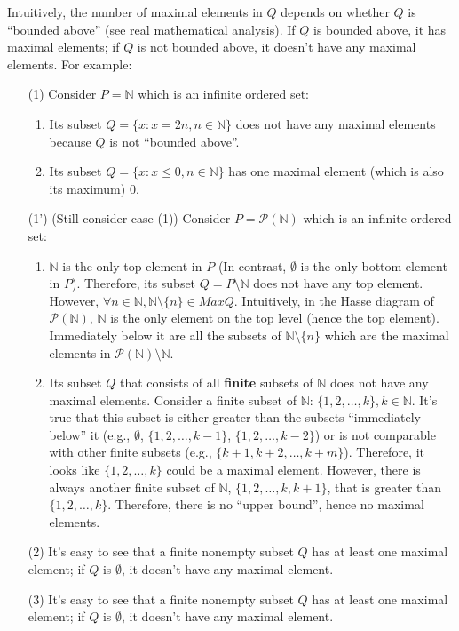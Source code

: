 \documentclass[12pt, letterpaper, oneside]{book}
\begin{document}
Intuitively, the number of maximal elements in $Q$ depends on whether $Q$ is ``bounded above'' (see real mathematical
analysis). If $Q$ is bounded above, it has maximal elements; if $Q$ is not bounded above, it doesn't have any maximal
elements. For example:
\begin{enumerate}
  \item[(1)] Consider $P = \mathbb{N}$ which is an infinite ordered set:
        \begin{enumerate}
          \item Its subset $Q = \{x: x = 2n, n \in \mathbb{N}\}$ does not have any maximal elements because $Q$ is not
                ``bounded above''.
          \item Its subset $Q = \{x: x \leqslant 0, n \in \mathbb{N}\}$ has one maximal element (which is also its
                maximum) 0.
        \end{enumerate}
  \item [(1')] (Still consider case (1)) Consider $P = \mathcal{P}(\mathbb{N})$ which is an infinite ordered set:
        \begin{enumerate}
          \item $\mathbb{N}$ is the only top element in $P$ (In contrast, $\emptyset$ is the only bottom element in
                $P$). Therefore, its subset $Q = P \setminus \mathbb{N}$ does not have any top element. However,
                $\forall n \in \mathbb{N}, \mathbb{N} \setminus \{n\} \in MaxQ$. Intuitively, in the Hasse diagram of
                $\mathcal{P}(\mathbb{N})$, $\mathbb{N}$ is the only element on the top level (hence the top element).
                Immediately below it are all the subsets of $\mathbb{N} \setminus \{n\}$ which are the maximal elements
                in $\mathcal{P}(\mathbb{N}) \setminus \mathbb{N}$.
          \item Its subset $Q$ that consists of all \textbf{finite} subsets of $\mathbb{N}$ does not have any maximal
                elements. Consider a finite subset of $\mathbb{N}$: $\{1, 2, \ldots, k\}, k \in \mathbb{N}$. It's true
                that this subset is either greater than the subsets ``immediately below'' it (e.g., $\emptyset$,
                $\{1, 2, \ldots, k-1\}$, $\{1, 2, \ldots, k-2\}$) or is not comparable with other finite subsets (e.g.,
                $\{k+1, k+2, \ldots, k+m\}$). Therefore, it looks like $\{1, 2, \ldots, k\}$ could be a maximal element.
                However, there is always another finite subset of $\mathbb{N}$, $\{1, 2, \ldots, k, k+1\}$, that is
                greater than $\{1, 2, \ldots, k\}$. Therefore, there is no ``upper bound'', hence no maximal elements.
        \end{enumerate}
  \item[(2)] It's easy to see that a finite nonempty subset $Q$ has at least one maximal element; if $Q$ is $\emptyset$,
        it doesn't have any maximal element.
  \item[(3)] It's easy to see that a finite nonempty subset $Q$ has at least one maximal element; if $Q$ is $\emptyset$,
        it doesn't have any maximal element.
\end{enumerate}
\end{document}
